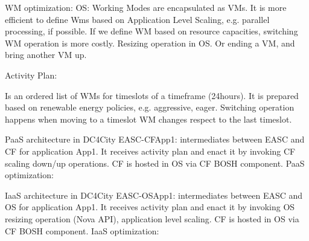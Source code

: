 WM optimization:
OS: Working Modes are encapsulated as VMs.
It is more efficient to define Wms based on Application Level Scaling, e.g. parallel processing, if possible.
If we define WM based on resource capacities,  switching WM operation is more costly.
Resizing operation in OS.
Or ending a VM, and bring another VM up.

Activity Plan:

Is an ordered list of WMs for timeslots of a timeframe (24hours).
It is prepared based on renewable energy policies, e.g. aggressive, eager.
Switching operation happens when moving to a timeslot WM changes respect to the last timeslot.

PaaS architecture in DC4City
EASC-CFApp1: intermediates between EASC and CF for application App1. It receives activity plan and enact it by invoking CF scaling down/up operations.
CF is hosted in OS via CF BOSH component.
PaaS optimization:

IaaS architecture in DC4City
EASC-OSApp1: intermediates between EASC and OS for application App1. It receives activity plan and enact it by invoking OS resizing operation (Nova API), application level scaling.
CF is hosted in OS via CF BOSH component.
IaaS optimization: